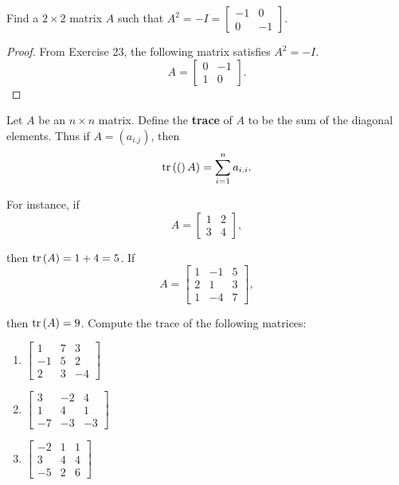 \begin{exercise}
    Find a $2\times 2$ matrix $A$ such that $A^{2} = -I = \begin{bmatrix}-1 & 0 \\ 0 & -1\end{bmatrix}$.
\end{exercise}

\begin{proof}
    From Exercise 23, the following matrix satisfies $A^{2} = -I$.
    \[
        A = \begin{bmatrix}
            0 & -1 \\
            1 & 0
        \end{bmatrix}.
    \]
\end{proof}

\begin{exercise}
    Let $A$ be an $n\times n$ matrix. Define the \textbf{trace} of $A$ to be the sum of the diagonal elements. Thus if $A = {(a_{i.j})}$, then
    \[
        \text{tr}\left({(}\right)A) = \sum^{n}_{i=1} a_{i.i}.
    \]

    For instance, if
    \[
        A = \begin{bmatrix}
            1 & 2 \\
            3 & 4
        \end{bmatrix},
    \]

    then $\text{tr}\left({A}\right) = 1 + 4 = 5$. If
    \[
        A = \begin{bmatrix}
            1 & -1 & 5 \\
            2 & 1  & 3 \\
            1 & -4 & 7
        \end{bmatrix},
    \]

    then $\text{tr}\left({A}\right) =9$. Compute the trace of the following matrices:
    \begin{enumerate}[label={(\alph*)}]
        \item $\begin{bmatrix}1 & 7 & 3 \\ -1 & 5 & 2 \\ 2 & 3 & -4\end{bmatrix}$
        \item $\begin{bmatrix}3 & -2 & 4 \\ 1 & 4 & 1 \\ -7 & -3 & -3\end{bmatrix}$
        \item $\begin{bmatrix}-2 & 1 & 1 \\ 3 & 4 & 4 \\ -5 & 2 & 6\end{bmatrix}$
    \end{enumerate}
\end{exercise}

